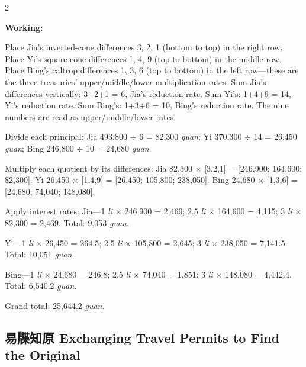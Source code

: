 \documentclass[11pt,a4paper]{article}
\newcommand{\EnWorking}{\par\noindent\textbf{Working:}\par\vspace{0.5ex}}
\begin{document}
\begin{paracol}{2}
\EnWorking
Place Jia's inverted-cone differences 3, 2, 1 (bottom to top) in the right row. Place Yi's square-cone differences 1, 4, 9 (top to bottom) in the middle row. Place Bing's caltrop differences 1, 3, 6 (top to bottom) in the left row---these are the three treasuries' upper/middle/lower multiplication rates. Sum Jia's differences vertically: 3+2+1 = 6, Jia's reduction rate. Sum Yi's: 1+4+9 = 14, Yi's reduction rate. Sum Bing's: 1+3+6 = 10, Bing's reduction rate. The nine numbers are read as upper/middle/lower rates.

Divide each principal: Jia 493,800 $\div$ 6 = 82,300 \textit{guan}; Yi 370,300 $\div$ 14 = 26,450 \textit{guan}; Bing 246,800 $\div$ 10 = 24,680 \textit{guan}.

Multiply each quotient by its differences: Jia 82,300 $\times$ [3,2,1] = [246,900; 164,600; 82,300]. Yi 26,450 $\times$ [1,4,9] = [26,450; 105,800; 238,050]. Bing 24,680 $\times$ [1,3,6] = [24,680; 74,040; 148,080].

Apply interest rates: Jia---1 \textit{li} $\times$ 246,900 = 2,469; 2.5 \textit{li} $\times$ 164,600 = 4,115; 3 \textit{li} $\times$ 82,300 = 2,469. Total: 9,053 \textit{guan}.

Yi---1 \textit{li} $\times$ 26,450 = 264.5; 2.5 \textit{li} $\times$ 105,800 = 2,645; 3 \textit{li} $\times$ 238,050 = 7,141.5. Total: 10,051 \textit{guan}.

Bing---1 \textit{li} $\times$ 24,680 = 246.8; 2.5 \textit{li} $\times$ 74,040 = 1,851; 3 \textit{li} $\times$ 148,080 = 4,442.4. Total: 6,540.2 \textit{guan}.

Grand total: 25,644.2 \textit{guan}.

\end{paracol}

\newpage

\subsection*{易牒知原 \quad Exchanging Travel Permits to Find the Original}
\end{document}
